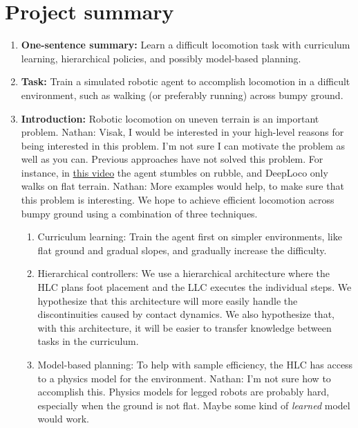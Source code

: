 \documentclass[a4paper]{article}
\newcommand{\nhatch}[1]{{\leavevmode\color{blue} Nathan: #1}}
\begin{document}
\section{Project summary}

\begin{enumerate}

\item \textbf{One-sentence summary:}
Learn a difficult locomotion task with curriculum learning, hierarchical policies, and possibly model-based planning.

\item \textbf{Task:}
Train a simulated robotic agent to accomplish locomotion in a difficult environment, such as walking (or preferably running) across bumpy ground.

\item \textbf{Introduction:} Robotic locomotion on uneven terrain is an important problem.
  \nhatch{Visak, I would be interested in your high-level reasons for being interested in this problem.
  I'm not sure I can motivate the problem as well as you can.} Previous approaches have not solved this problem.
  For instance, in \href{https://www.youtube.com/watch?v=hx_bgoTF7bs&feature=youtu.be&t=1m28s}{this video} the agent stumbles on rubble, and DeepLoco only walks on flat terrain.
  \nhatch{More examples would help, to make sure that this problem is interesting.} We hope to achieve efficient locomotion across bumpy ground using a combination of three techniques.
  \begin{enumerate}
    \item Curriculum learning: Train the agent first on simpler environments, like flat ground and gradual slopes, and gradually increase the difficulty.
    \item Hierarchical controllers: We use a hierarchical architecture where the HLC plans foot placement and the LLC executes the individual steps.
      We hypothesize that this architecture will more easily handle the discontinuities caused by contact dynamics.
      We also hypothesize that, with this architecture, it will be easier to transfer knowledge between tasks in the curriculum.
    \item Model-based planning: To help with sample efficiency, the HLC has access to a physics model for the environment.
      \nhatch{I'm not sure how to accomplish this.
      Physics models for legged robots are probably hard, especially when the ground is not flat.
      Maybe some kind of \emph{learned} model would work.}
  \end{enumerate}


\end{enumerate}
\end{document}
